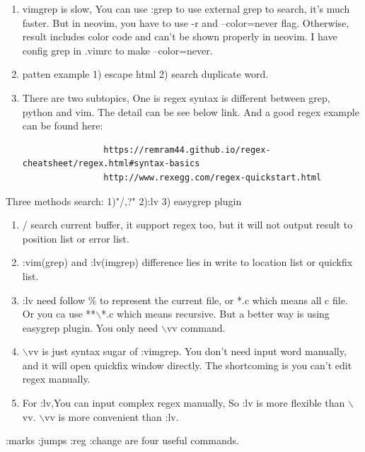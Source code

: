 \documentclass[paper=8.5in:11in, twoside, 12pt, pagesize=pdftex]{book}
\begin{document}
\begin{enumerate}
			\item vimgrep is slow, You can use :grep to use external grep to search, it's much faster. But in neovim, you have to use -r and --color=never flag. Otherwise, result includes color code and can't be shown properly in neovim. I have config grep in .vimrc to make --color=never. 
			
			\item patten example 1) escape html 2) search duplicate word. 
			
			\item There are two subtopics, One is regex syntax is different between grep, python and vim. The detail can be see below link.  And a good regex example can be found here:
			\begin{verbatim}
				https://remram44.github.io/regex-cheatsheet/regex.html#syntax-basics 
				http://www.rexegg.com/regex-quickstart.html
			\end{verbatim}	
		\end{enumerate}
		
Three methods search: 1)"/,?" 2):lv 3) easygrep plugin
		\begin{enumerate}
			\item / search current buffer, it support regex too, but it will not output result to position list or error list. 
			
			\item :vim(grep) and :lv(imgrep) difference lies in write to location list or quickfix list.
			
			\item :lv need follow \% to represent the current file, or *.c which means all c file. Or you ca use **$\backslash$*.c which means recursive. But a better way is using easygrep plugin. You only need $\backslash$vv command.
			
			\item $\backslash$vv is just syntax sugar of :vimgrep. You don't need input word manually, and it will open quickfix window directly. The shortcoming is you can't edit regex manually. 
			
			
			\item For :lv,You can input complex regex manually, So :lv is more flexible than $\backslash$vv. $\backslash$vv is more convenient than :lv. 
		\end{enumerate}
		
:marks :jumps :reg :change are four useful commands. 
		
\end{document}
